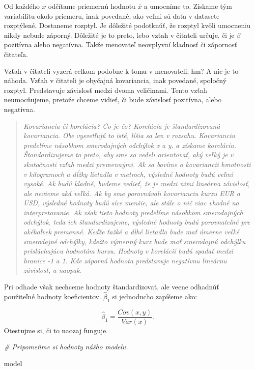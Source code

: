\documentclass[]{article}
\newenvironment{Shaded}{\begin{snugshade}}{\end{snugshade}}
\newcommand{\CommentTok}[1]{\textcolor[rgb]{0.56,0.35,0.01}{\textit{#1}}}
\newcommand{\NormalTok}[1]{#1}
\begin{document}
Od každého \(x\) odčítame priemernú hodnotu \(\overline{x}\) a umocníme
to. Získame tým variabilitu okolo priemeru, inak povedané, ako veľmi sú
data v datasete rozptýlené. Dostaneme rozptyl. Je dôležité podotknúť, že
rozptyl kvôli umocneniu nikdy nebude záporný. Dôležité je to preto, lebo
vzťah v čitateli určuje, či je \(\beta\) pozitívna alebo negatívna.
Takže menovateľ neovplyvní kladnosť či zápornosť čitateľa.

Vzťah v čitateli vyzerá celkom podobne k tomu v menovateli, hm? A nie je
to náhoda. Vzťah v čitateli je obyčajná kovariancia, inak povedané,
spoločný rozptyl. Predstavuje závislosť medzi dvoma veličinami. Tento
vzťah neumocňujeme, pretože chceme vidieť, či bude závislosť pozitívna,
alebo negatívna.

\begin{quote}
\emph{Kovariancia či korelácia? Čo je čo? Korelácia je štandardizovaná
kovariancia. Obe vysvetľujú to isté, líšia sa len v rozsahu. Kovarianciu
predelíme násobkom smerodajných odchýlok x a y, a získame koreláciu.
Štandardizujeme to preto, aby sme sa vedeli orientovať, aký veľký je v
skutočnosti vzťah medzi premennými. Ak sa bavíme o kovariancii hmotnosti
v kilogramoch a dĺžky lietadla v metroch, výsledné hodnoty budú veľmi
vysoké. Ak budú kladné, budeme vedieť, že je medzi nimi lineárna
závislosť, ale nevieme aká veľká. Ak by sme porovnávali kovarianciu
kurzu EUR a USD, výsledné hodnoty budú síce menšie, ale stále o nič viac
vhodné na interpretovanie. Ak však tieto hodnoty predelíme násobkom
smerodajných odchýlok, teda ich štandardizujeme, výsledné hodnoty budú
porovnateľné pre akékoľvek premenné. Keďže ťažké a dlhé lietadlo bude
mať úmerne veľké smerodajné odchýlky, kdežto výmenný kurz bude mať
smerodajnú odchýlku prislúchajúcu hodnotám kurzu. Hodnoty v korelácií
budú spadať medzi hranice -1 a 1. Kde záporná hodnota predstavuje
negatívnu lineárnu závislosť, a naopak.}
\end{quote}

Pri odhade však nechceme hodnoty štandardizovať, ale vecne odhadnúť
použiteľné hodnoty koeficientov. \(\hat\beta_1\) si jednoducho zapíšeme
ako:

\[\hat\beta_1 = \frac{Cov(x, y)}{Var(x)}.\] Otestujme si, či to naozaj
funguje.

\begin{Shaded}
\begin{Highlighting}[]
\CommentTok{# Pripomeňme si hodnoty nášho modelu.}

\NormalTok{model}
\end{Highlighting}
\end{Shaded}
\end{document}
